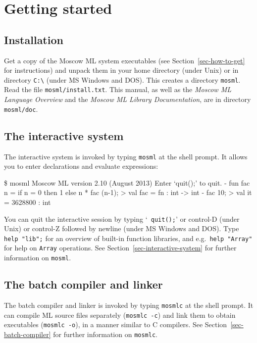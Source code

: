 \documentclass[fleqn,a4paper]{article}
\begin{document}
\vfill


\newpage

\section{Getting started}
\label{sec-getting-started}

\subsection{Installation}

Get a copy of the Moscow ML system executables (see
Section~\ref{sec-how-to-get} for instructions) and unpack them in your
home directory (under Unix) or in directory \verb#C:\# (under MS
Windows and DOS)\@.  This creates a directory {\tt mosml}.  Read the
file {\tt mosml/install.txt}.  This manual, as well as the {\em Moscow
  ML Language Overview\/} and the \emph{Moscow ML Library
  Documentation}, are in directory {\tt mosml/doc}.


\subsection{The interactive system}

The interactive system is invoked by typing {\tt mosml} at the shell
prompt.  It allows you to enter declarations and evaluate expressions:

\begin{program}
\$ mosml
Moscow ML version 2.10 (August 2013)
Enter `quit();' to quit.
-  fun fac n = if n = 0 then 1 else n * fac (n-1);
> val fac = fn : int -> int
-  fac 10;
> val it = 3628800 : int
\end{program}

\noindent You can quit the interactive session by typing `{\tt
  quit();}' or control-D (under Unix) or control-Z followed by newline
(under MS Windows and DOS)\@.  Type {\tt help "lib";} for an overview
of built-in function libraries, and e.g.\ {\tt help "Array"} for help
on {\tt Array} operations.  See Section~\ref{sec-interactive-system}
for further information on {\tt mosml}.


\subsection{The batch compiler and linker}

The batch compiler and linker is invoked by typing {\tt mosmlc} at the
shell prompt.  It can compile ML source files separately ({\tt mosmlc
  -c}) and link them to obtain executables ({\tt mosmlc -o}), in a
manner similar to C compilers.  See Section~\ref{sec-batch-compiler}
for further information on {\tt mosmlc}.
\end{document}
